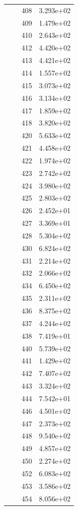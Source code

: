 \documentclass[12pt]{article}
\begin{document}
\begin{longtable}{@{}cccc@{}}
 &  & 408 & 3.293e+02 \\
 &  & 409 & 1.479e+02 \\
 &  & 410 & 2.643e+02 \\
 &  & 412 & 4.420e+02 \\
 &  & 413 & 4.421e+02 \\
 &  & 414 & 1.557e+02 \\
 &  & 415 & 3.073e+02 \\
 &  & 416 & 3.134e+02 \\
 &  & 417 & 1.859e+02 \\
 &  & 418 & 3.820e+02 \\
 &  & 420 & 5.633e+02 \\
 &  & 421 & 4.458e+02 \\
 &  & 422 & 1.974e+02 \\
 &  & 423 & 2.742e+02 \\
 &  & 424 & 3.980e+02 \\
 &  & 425 & 2.803e+02 \\
 &  & 426 & 2.452e+01 \\
 &  & 427 & 3.369e+01 \\
 &  & 428 & 5.304e+02 \\
 &  & 430 & 6.824e+02 \\
 &  & 431 & 2.214e+02 \\
 &  & 432 & 2.066e+02 \\
 &  & 434 & 6.450e+02 \\
 &  & 435 & 2.311e+02 \\
 &  & 436 & 8.375e+02 \\
 &  & 437 & 4.244e+02 \\
 &  & 438 & 7.419e+01 \\
 &  & 440 & 5.739e+02 \\
 &  & 441 & 1.429e+02 \\
 &  & 442 & 7.407e+02 \\
 &  & 443 & 3.324e+02 \\
 &  & 444 & 7.542e+01 \\
 &  & 446 & 4.501e+02 \\
 &  & 447 & 2.373e+02 \\
 &  & 448 & 9.540e+02 \\
 &  & 449 & 4.857e+02 \\
 &  & 450 & 2.274e+02 \\
 &  & 452 & 6.083e+02 \\
 &  & 453 & 3.586e+02 \\
 &  & 454 & 8.056e+02 \\

\end{longtable}
\end{document}
